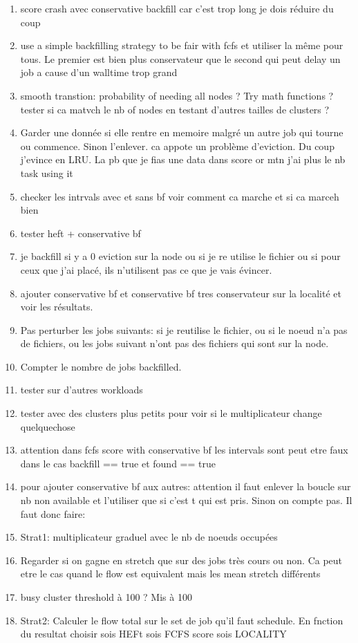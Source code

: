 \documentclass[a4paper]{article}
\begin{document}
\begin{enumerate}
			\item score crash avec conservative backfill car c'est trop long je dois réduire du coup
		
			\item use a simple backfilling strategy to be fair with fcfs et utiliser la même pour tous. Le premier est bien plus conservateur que le second qui peut delay un job a cause d'un walltime trop grand
			\item smooth transtion: probability of needing all nodes ? Try math functions ? tester si ca matvch le nb of nodes en testant d'autres tailles de clusters ?
			\item Garder une donnée si elle rentre en memoire malgré un autre job qui tourne ou commence. Sinon l'enlever. ca appote un problème d'eviction. Du coup j'evince en LRU. La pb que je fias une data dans score or mtn j'ai plus le nb task using it
		
			\item checker les intrvals avec et sans bf voir comment ca marche et si ca marceh bien
			\item tester heft + conservative bf
			\item je backfill si y a 0 eviction sur la node ou si je re utilise le fichier ou si pour ceux que j'ai placé, ils n'utilisent pas ce que je vais évincer.
			\item ajouter conservative bf et conservative bf tres conservateur sur la localité et voir les résultats.
				\item Pas perturber les jobs suivants: si je reutilise le fichier, ou si le noeud n'a pas de fichiers, ou les jobs suivant n'ont pas des fichiers qui sont sur la node.
			\item Compter le nombre de jobs backfilled.
			\item tester sur d'autres workloads
			\item tester avec des clusters plus petits pour voir si le multiplicateur change quelquechose
			\item attention dans fcfs score with conservative bf les intervals sont peut etre faux dans le cas backfill == true et found == true
			\item pour ajouter conservative bf aux autres: attention il faut enlever la boucle sur nb non available et l'utiliser que si c'est t qui est pris. Sinon on compte pas. Il faut donc faire:

			\item Strat1: multiplicateur graduel avec le nb de noeuds occupées
			\item Regarder si on gagne en stretch que sur des jobs très cours ou non. Ca peut etre le cas quand le flow est equivalent mais les mean stretch différents
			\item busy cluster threshold à 100 ? Mis à 100
			\item Strat2: Calculer le flow total sur le set de job qu'il faut schedule. En fnction du resultat choisir sois HEFt sois FCFS score sois LOCALITY
 			

\end{enumerate}
\end{document}
